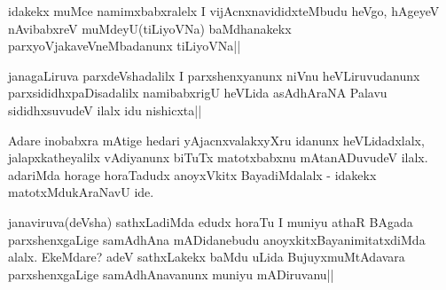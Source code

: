 \begin{artha}
idakekx muMce namimxbabxralelx I vijAcnxnavididxteMbudu heVgo, hAgeyeV nAvibabxreV muMdeyU(tiLiyoVNa) baMdhanakekx parxyoVjakaveVneMbadanunx tiLiyoVNa||
\end{artha}

\begin{artha}
janagaLiruva parxdeVshadalilx I parxshenxyanunx niVnu heVLiruvudanunx parxsididhxpaDisadalilx namibabxrigU heVLida asAdhAraNA Palavu sididhxsuvudeV ilalx idu nishicxta||
\end{artha}

\begin{artha}
Adare inobabxra mAtige hedari yAjacnxvalakxyXru idanunx heVLidadxlalx, jalapxkatheyalilx vAdiyanunx biTuTx matotxbabxnu mAtanADuvudeV ilalx. adariMda horage horaTadudx anoyxVkitx BayadiMdalalx - idakekx matotxMdukAraNavU ide.
\end{artha}

\begin{artha}
janaviruva(deVsha) sathxLadiMda edudx horaTu I muniyu athaR BAgada parxshenxgaLige samAdhAna mADidanebudu anoyxkitxBayanimitatxdiMda alalx. EkeMdare? adeV sathxLakekx baMdu uLida BujuyxmuMtAdavara parxshenxgaLige samAdhAnavanunx muniyu mADiruvanu||
\end{artha}
